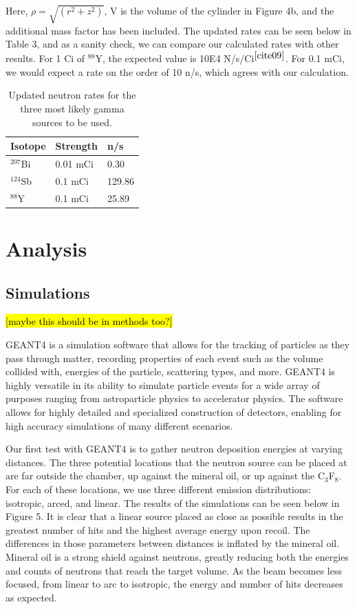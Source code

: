 \documentclass[%
12pt,
twoside,
reprint,
amsmath,amssymb,
aps,
]{article}
\begin{document}
	Here, $\rho = \sqrt{(r^{2} + z^{2})}$, V is the volume of the cylinder in Figure 4b, and the additional mass factor has been included. The updated rates can be seen below in Table 3, and as a sanity check, we can compare our calculated rates with other results. For 1 Ci of $^{88}$Y, the expected value is 10E4 N/s/Ci$^{\cite{cite09}}$. For 0.1 mCi, we would expect a rate on the order of 10 n/s, which agrees with our calculation.
	
	\begin{table}
		\begin{center}
			\scriptsize
			\begin{tabular}{p{3.1cm} p{3.1cm} p{3.1cm}}
				\hline
				\textbf{Isotope} & Strength & \textbf{n/s} \\ \hline
				$^{207}$Bi & 0.01 mCi & 0.30 \\ \hline
				$^{124}$Sb & 0.1 mCi & 129.86 \\ \hline
				$^{88}$Y & 0.1 mCi & 25.89 \\ \hline
			\end{tabular}
			\caption{Updated neutron rates for the three most likely gamma sources to be used.}
		\end{center}
	\end{table}

	\section{Analysis}
	\subsection{Simulations}
	\hl{[maybe this should be in methods too?]}
	\par GEANT4 is a simulation software that allows for the tracking of particles as they pass through matter, recording properties of each event such as the volume collided with, energies of the particle, scattering types, and more. GEANT4 is highly versatile in its ability to simulate particle events for a wide array of purposes ranging from astroparticle physics to accelerator physics. The software allows for highly detailed and specialized construction of detectors, enabling for high accuracy simulations of many different scenarios.
	\par Our first test with GEANT4 is to gather neutron deposition energies at varying distances. The three potential locations that the neutron source can be placed at are far outside the chamber, up against the mineral oil, or up against the C$_{3}$F$_{8}$. For each of these locations, we use three different emission distributions: isotropic, arced, and linear. The results of the simulations can be seen below in Figure 5. It is clear that a linear source placed as close as possible results in the greatest number of hits and the highest average energy upon recoil. The differences in those parameters between distances is inflated by the mineral oil. Mineral oil is a strong shield against neutrons, greatly reducing both the energies and counts of neutrons that reach the target volume. As the beam becomes less focused, from linear to arc to isotropic, the energy and number of hits decreases as expected.
	
\end{document}

